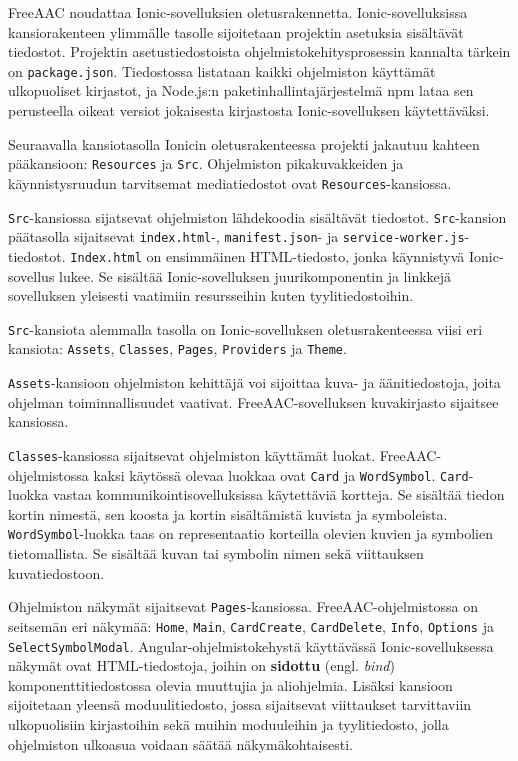 \documentclass[utf8]{gradu3}
\begin{document}
FreeAAC noudattaa Ionic-sovelluksien oletusrakennetta. Ionic-sovelluksissa kansiorakenteen ylimmälle tasolle sijoitetaan projektin asetuksia sisältävät tiedostot. Projektin asetustiedostoista ohjelmistokehitysprosessin kannalta tärkein on \texttt{package.json}. Tiedostossa listataan kaikki ohjelmiston käyttämät ulkopuoliset kirjastot, ja Node.js:n paketinhallintajärjestelmä npm lataa sen perusteella oikeat versiot jokaisesta kirjastosta Ionic-sovelluksen käytettäväksi.

Seuraavalla kansiotasolla Ionicin oletusrakenteessa projekti jakautuu kahteen pääkansioon: \texttt{Resources} ja \texttt{Src}. Ohjelmiston pikakuvakkeiden ja käynnistysruudun tarvitsemat mediatiedostot ovat \texttt{Resources}-kansiossa.

\texttt{Src}-kansiossa sijatsevat ohjelmiston lähdekoodia sisältävät tiedostot. \texttt{Src}-kansion päätasolla sijaitsevat \texttt{index.html}-, \texttt{manifest.json}- ja \texttt{service-worker.js}-tiedostot. \texttt{Index.html} on ensimmäinen HTML-tiedosto, jonka käynnistyvä Ionic-sovellus lukee. Se sisältää Ionic-sovelluksen juurikomponentin ja linkkejä sovelluksen yleisesti vaatimiin resursseihin kuten tyylitiedostoihin.

\texttt{Src}-kansiota alemmalla tasolla on Ionic-sovelluksen oletusrakenteessa viisi eri kansiota: \texttt{Assets}, \texttt{Classes}, \texttt{Pages}, \texttt{Providers} ja \texttt{Theme}.

\texttt{Assets}-kansioon ohjelmiston kehittäjä voi sijoittaa kuva- ja äänitiedostoja, joita ohjelman toiminnallisuudet vaativat. FreeAAC-sovelluksen kuvakirjasto sijaitsee kansiossa.

\texttt{Classes}-kansiossa sijaitsevat ohjelmiston käyttämät luokat. FreeAAC-ohjelmistossa kaksi käytössä olevaa luokkaa ovat \texttt{Card} ja \texttt{WordSymbol}. \texttt{Card}-luokka vastaa kommunikointisovelluksissa käytettäviä kortteja. Se sisältää tiedon kortin nimestä, sen koosta ja kortin sisältämistä kuvista ja symboleista. \texttt{WordSymbol}-luokka taas on representaatio korteilla olevien kuvien ja symbolien tietomallista. Se sisältää kuvan tai symbolin nimen sekä viittauksen kuvatiedostoon.

Ohjelmiston näkymät sijaitsevat \texttt{Pages}-kansiossa. FreeAAC-ohjelmistossa on seitsemän eri näkymää: \texttt{Home}, \texttt{Main}, \texttt{CardCreate}, \texttt{CardDelete}, \texttt{Info}, \texttt{Options} ja \texttt{SelectSymbolModal}. Angular-ohjelmistokehystä käyttävässä Ionic-sovelluksessa näkymät ovat HTML-tiedostoja, joihin on \textbf{sidottu} (engl. \textit{bind}) komponenttitiedostossa olevia muuttujia ja aliohjelmia. Lisäksi kansioon sijoitetaan yleensä moduulitiedosto, jossa sijaitsevat viittaukset tarvittaviin ulkopuolisiin kirjastoihin sekä muihin moduuleihin ja tyylitiedosto, jolla ohjelmiston ulkoasua voidaan säätää näkymäkohtaisesti.
\end{document}
